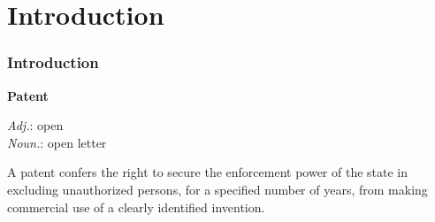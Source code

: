 
\setlength{\parskip}{\baselineskip} 
\section{Introduction}
\begin{frame}[t]
\frametitle{Introduction}

\begin{center}
	\textbf{Patent}
\end{center}

\textit{Adj.}: open\\
\textit{Noun.}: open letter

A patent confers the right to secure the enforcement power of the state in excluding unauthorized persons, for a specified number of years, from making commercial use of a clearly identified invention.

\end{frame}


